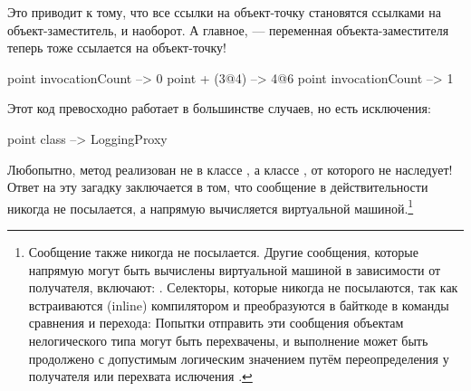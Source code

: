 \documentclass[a4paper,10pt,twoside]{book}
\begin{document}
Это приводит к тому, что все ссылки на объект-точку становятся ссылками на объект-заместитель, и наоборот. А главное, --- переменная  объекта-заместителя теперь тоже ссылается на объект-точку!

\begin{code}{}
point invocationCount --> 0
point + (3@4)             --> 4@6
point invocationCount --> 1
\end{code}

Этот код превосходно работает в большинстве случаев, но есть исключения:
\begin{code}{}
point class --> LoggingProxy
\end{code}
Любопытно, метод  реализован не в классе , а классе , от которого  не наследует!
Ответ на эту загадку заключается в том, что сообщение  в действительности никогда не посылается, а напрямую вычисляется виртуальной машиной.\footnote{Сообщение  также никогда не посылается.
Другие сообщения, которые напрямую могут быть вычислены виртуальной машиной в зависимости от получателя, включают:
\ct{+- < > <= >= = ~= * / \ ==}
.
Селекторы, которые никогда не посылаются, так как встраиваются (inline) компилятором и преобразуются в байткоде в команды сравнения и перехода:
Попытки отправить эти сообщения объектам нелогического типа могут быть перехвачены, и выполнение может быть продолжено с допустимым логическим значением путём переопределения  у получателя или перехвата ислючения .
}%
\end{document}
